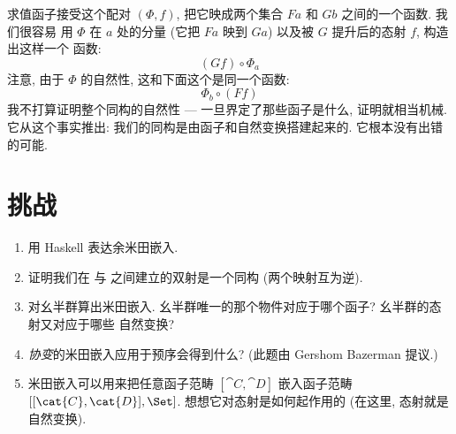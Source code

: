 求值函子接受这个配对 $(\Phi, f)$, 把它映成两个集合 $F a$ 和 $G b$ 之间的一个函数. 我们很容易
用 $\Phi$ 在 $a$ 处的分量 (它把 $F a$ 映到 $G a$) 以及被 $G$ 提升后的态射 $f$, 构造出这样一个
函数:
\[(G f) \circ \Phi_a\]
注意, 由于 $\Phi$ 的自然性, 这和下面这个是同一个函数:
\[\Phi_b \circ (F f)\]
我不打算证明整个同构的自然性 --- 一旦界定了那些函子是什么, 证明就相当机械. 它从这个事实推出:
我们的同构是由函子和自然变换搭建起来的. 它根本没有出错的可能.

\section{挑战}

\begin{enumerate}
  \tightlist
  \item
        用 Haskell 表达余米田嵌入.
  \item
        证明我们在  与  之间建立的双射是一个同构 (两个映射互为逆).
  \item
        对幺半群算出米田嵌入. 幺半群唯一的那个物件对应于哪个函子? 幺半群的态射又对应于哪些
        自然变换?
  \item
        \emph{协变}的米田嵌入应用于预序会得到什么? (此题由 Gershom Bazerman 提议.)
  \item
        米田嵌入可以用来把任意函子范畴 $[\cat{C}, \cat{D}]$ 嵌入函子范畴
        $[[\cat{C}, \cat{D}], \Set]$. 想想它对态射是如何起作用的 (在这里, 态射就是自然变换).
\end{enumerate}
